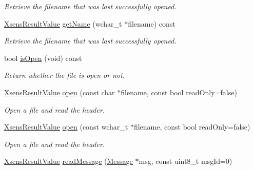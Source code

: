 \begin{DoxyCompactItemize}
\begin{DoxyCompactList}\small\item\em \-Retrieve the filename that was last successfully opened. \end{DoxyCompactList}\item 
\hypertarget{classxsens_1_1Cmt2f_a724e72138fbe29cc20eff1d7f9d6183f}{\hyperlink{group__enums_ga822a2260a20af524029eef9e9a51ff6f}{\-Xsens\-Result\-Value} \hyperlink{classxsens_1_1Cmt2f_a724e72138fbe29cc20eff1d7f9d6183f}{get\-Name} (wchar\-\_\-t $\ast$filename) const }\label{classxsens_1_1Cmt2f_a724e72138fbe29cc20eff1d7f9d6183f}

\begin{DoxyCompactList}\small\item\em \-Retrieve the filename that was last successfully opened. \end{DoxyCompactList}\item 
\hypertarget{classxsens_1_1Cmt2f_a5435b3fa06f7afde8e6cc58d4195d005}{bool \hyperlink{classxsens_1_1Cmt2f_a5435b3fa06f7afde8e6cc58d4195d005}{is\-Open} (void) const }\label{classxsens_1_1Cmt2f_a5435b3fa06f7afde8e6cc58d4195d005}

\begin{DoxyCompactList}\small\item\em \-Return whether the file is open or not. \end{DoxyCompactList}\item 
\hypertarget{classxsens_1_1Cmt2f_aea0ba51bd0aa1e97ef181bc501401658}{\hyperlink{group__enums_ga822a2260a20af524029eef9e9a51ff6f}{\-Xsens\-Result\-Value} \hyperlink{classxsens_1_1Cmt2f_aea0ba51bd0aa1e97ef181bc501401658}{open} (const char $\ast$filename, const bool read\-Only=false)}\label{classxsens_1_1Cmt2f_aea0ba51bd0aa1e97ef181bc501401658}

\begin{DoxyCompactList}\small\item\em \-Open a file and read the header. \end{DoxyCompactList}\item 
\hypertarget{classxsens_1_1Cmt2f_ac03c77dfad74a8b69da1b8473d4ff56c}{\hyperlink{group__enums_ga822a2260a20af524029eef9e9a51ff6f}{\-Xsens\-Result\-Value} \hyperlink{classxsens_1_1Cmt2f_ac03c77dfad74a8b69da1b8473d4ff56c}{open} (const wchar\-\_\-t $\ast$filename, const bool read\-Only=false)}\label{classxsens_1_1Cmt2f_ac03c77dfad74a8b69da1b8473d4ff56c}

\begin{DoxyCompactList}\small\item\em \-Open a file and read the header. \end{DoxyCompactList}\item 
\hypertarget{classxsens_1_1Cmt2f_a1d3dcc7a6b8da8f619fa1713606cdda2}{\hyperlink{group__enums_ga822a2260a20af524029eef9e9a51ff6f}{\-Xsens\-Result\-Value} \hyperlink{classxsens_1_1Cmt2f_a1d3dcc7a6b8da8f619fa1713606cdda2}{read\-Message} (\hyperlink{classxsens_1_1Message}{\-Message} $\ast$msg, const uint8\-\_\-t msg\-Id=0)}\label{classxsens_1_1Cmt2f_a1d3dcc7a6b8da8f619fa1713606cdda2}


\end{DoxyCompactItemize}
